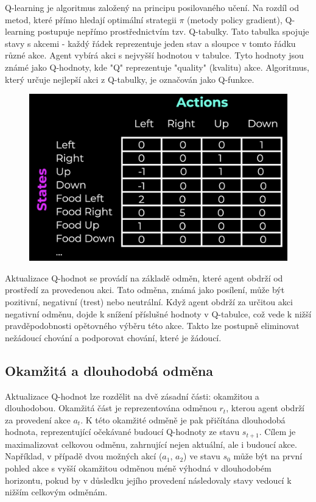 \documentclass[12pt, a4paper,
twoside,        %
openright
]{report}
\begin{document}
Q-learning je algoritmus založený na principu posilovaného učení. Na rozdíl od metod, které přímo hledají optimální strategii $\pi$ (metody policy gradient), Q-learning postupuje nepřímo prostřednictvím tzv. Q-tabulky. Tato tabulka spojuje stavy s akcemi - každý řádek reprezentuje jeden stav a sloupce v tomto řádku různé akce. Agent vybírá akci s nejvyšší hodnotou v tabulce. Tyto hodnoty jsou známé jako Q-hodnoty, kde "Q" reprezentuje "quality" (kvalitu) akce. Algoritmus, který určuje nejlepší akci z Q-tabulky, je označován jako Q-funkce.
\begin{figure}[h]
	\centering
	\includegraphics[width=0.8\linewidth, height=0.8\linewidth, keepaspectratio]{image/qlearn.png}
	
\end{figure}
Aktualizace Q-hodnot se provádí na základě odměn, které agent obdrží od prostředí za provedenou akci. Tato odměna, známá jako posílení, může být pozitivní, negativní (trest) nebo neutrální. Když agent obdrží za určitou akci negativní odměnu, dojde k snížení příslušné hodnoty v Q-tabulce, což vede k nižší pravděpodobnosti opětovného výběru této akce. Takto lze postupně eliminovat nežádoucí chování a podporovat chování, které je žádoucí.

\subsection{Okamžitá a dlouhodobá odměna}
Aktualizace Q-hodnot lze rozdělit na dvě zásadní části: okamžitou a dlouhodobou. Okamžitá část je reprezentována odměnou $r_{t}$, kterou agent obdrží za provedení akce $a_{t}$. K této okamžité odměně je pak přičítána dlouhodobá hodnota, reprezentující očekávané budoucí Q-hodnoty ze stavu $s_{t+1}$. Cílem je maximalizovat celkovou odměnu, zahrnující nejen aktuální, ale i budoucí akce. Například, v případě dvou možných akcí ($a_{1}$, $a_{2}$) ve stavu $s_{0}$ může být na první pohled akce s vyšší okamžitou odměnou méně výhodná v dlouhodobém horizontu, pokud by v důsledku jejího provedení následovaly stavy vedoucí k nižším celkovým odměnám.
\end{document}
